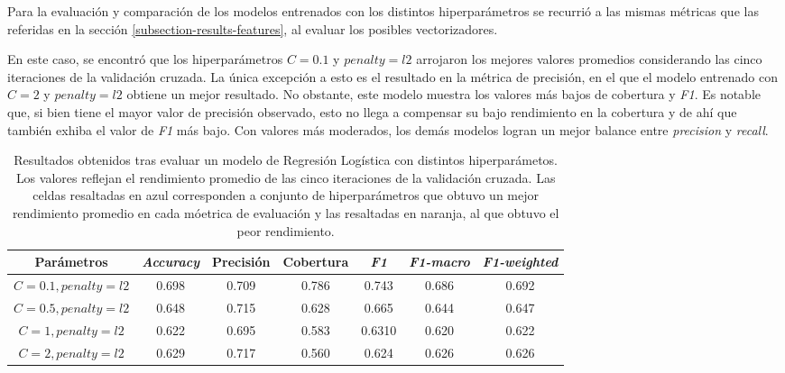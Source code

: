 Para la evaluación y comparación de los modelos entrenados con los
distintos hiperparámetros se recurrió a las mismas métricas que las
referidas en la sección \ref{subsection-results-features}, al evaluar
los posibles vectorizadores.
\par
En este caso, se encontró que los hiperparámetros $C=0.1$ y $penalty=l2$
arrojaron los mejores valores promedios considerando las cinco iteraciones
de la validación cruzada. La única excepción a esto es el resultado en la
métrica de precisión, en el que el modelo entrenado con $C=2$ y $penalty=l2$
obtiene un mejor resultado. No obstante, este modelo muestra los valores
más bajos de cobertura y \textit{F1}. Es notable que, si bien tiene el mayor
valor de precisión observado, esto no llega a compensar su bajo rendimiento
en la cobertura y de ahí que también exhiba el valor de \textit{F1} más bajo.
Con valores más moderados, los demás modelos logran un mejor balance entre
\textit{precision} y \textit{recall}.

\begin{table}[h!]
    \centering
    \begin{adjustbox}{max width=\textwidth}
    \begin{tabular}{ *{7}{|c}| }
    \hline
    Parámetros & \textit{Accuracy} & Precisión & Cobertura & \textit{F1} & \textit{F1-macro} & \textit{F1-weighted} \\
    \hline\hline
    $C=0.1, penalty=l2$ & 0.698 & 0.709 & 0.786  & 0.743 & 0.686 & 0.692 \\
    \hline
    $C=0.5, penalty=l2$ & 0.648 & 0.715 & 0.628  & 0.665 & 0.644 & 0.647 \\
    \hline
    $C=1, penalty=l2$ & 0.622 & 0.695 & 0.583 & 0.6310 & 0.620 & 0.622 \\
    \hline
    $C=2, penalty=l2$ & 0.629 & 0.717 & 0.560 & 0.624 & 0.626 & 0.626 \\
    \hline
\end{tabular}
\end{adjustbox}
\caption{Resultados obtenidos tras evaluar un modelo de Regresión Logística con
distintos hiperparámetos. Los valores reflejan el rendimiento promedio de las
cinco iteraciones de la validación cruzada. Las celdas resaltadas en azul
corresponden a conjunto de hiperparámetros que obtuvo un mejor rendimiento
promedio en cada móetrica de evaluación y las resaltadas en naranja, al
que obtuvo el peor rendimiento.}
\end{table}

